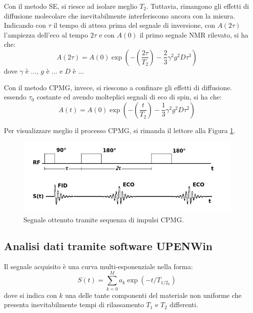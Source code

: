 Con il metodo SE, si riesce ad isolare meglio $T_2$. Tuttavia, rimangono gli effetti di diffusione molecolare che inevitabilmente interferiscono ancora con la misura. Indicando con $\tau$ il tempo di attesa prima del segnale di inversione, con $A(2\tau)$ l'ampiezza dell'eco al tempo $2\tau$ e con $A(0)$ il primo segnale NMR rilevato, si ha che:
\begin{equation}
	A(2\tau) = A(0)\exp\left(-\left(\frac{2\tau}{T_2}\right) - \frac{2}{3} \gamma^2 g^2 D \tau^3\right)
\end{equation}
dove $\gamma$ è ..., $g$ è ... e $D$ è ...

Con il metodo CPMG, invece, si riescono a confinare gli effetti di diffusione. essendo $\tau_0$ costante ed avendo molteplici segnali di eco di spin, si ha che:
\begin{equation}
	A(t) = A(0)\exp\left(-\left(\frac{t}{T_2}\right) - \frac{1}{3} \gamma^2 g^2 D \tau^2\right)
\end{equation}

Per visualizzare meglio il processo CPMG, si rimanda il lettore alla Figura \ref{fig:cpmg}.

\begin{figure}
\centering
\includegraphics[width=\textwidth]{Figure/cpmg.jpg}
\caption{Segnale ottenuto tramite sequenza di impulsi CPMG.}
\label{fig:cpmg}
\end{figure}


\subsection*{Analisi dati tramite software UPENWin}

Il segnale acquisito è una curva multi-esponenziale nella forma:
\begin{equation}
	S(t) = \sum_{k=0}^M a_k \exp(-t/T_{1/2_k})
\end{equation}
dove si indica con $k$ una delle tante componenti del materiale non uniforme che presenta inevitabilmente tempi di rilassamento $T_1$ e $T_2$ differenti.

